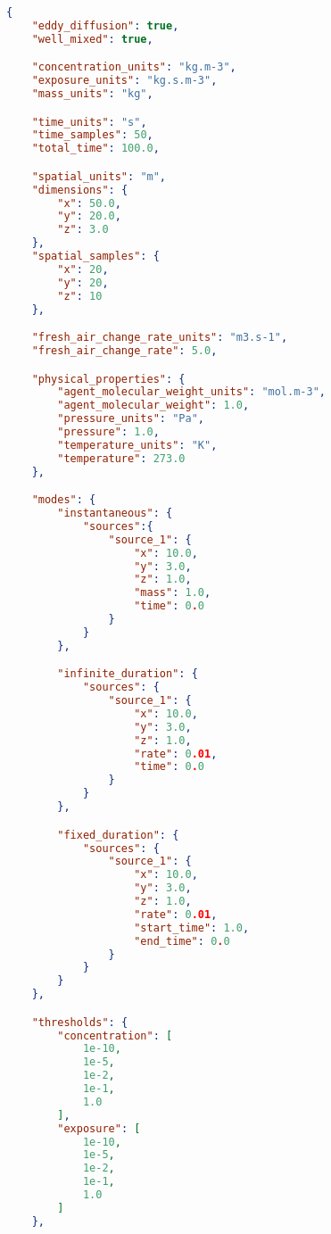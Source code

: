 \begin{lstlisting}[language=json,firstnumber=1]
{
    "eddy_diffusion": true,
    "well_mixed": true,

    "concentration_units": "kg.m-3",
    "exposure_units": "kg.s.m-3",
    "mass_units": "kg",

    "time_units": "s",
    "time_samples": 50,
    "total_time": 100.0,

    "spatial_units": "m",
    "dimensions": {
        "x": 50.0,
        "y": 20.0,
        "z": 3.0
    },
    "spatial_samples": {
        "x": 20,
        "y": 20,
        "z": 10 
    },

    "fresh_air_change_rate_units": "m3.s-1",
    "fresh_air_change_rate": 5.0,

    "physical_properties": {
        "agent_molecular_weight_units": "mol.m-3",
        "agent_molecular_weight": 1.0,
        "pressure_units": "Pa",
        "pressure": 1.0,
        "temperature_units": "K",
        "temperature": 273.0
    },

    "modes": {
        "instantaneous": {
            "sources":{
                "source_1": {
                    "x": 10.0,
                    "y": 3.0,
                    "z": 1.0,
                    "mass": 1.0,
                    "time": 0.0
                }
            }
        },

        "infinite_duration": {
            "sources": {
                "source_1": {
                    "x": 10.0,
                    "y": 3.0,
                    "z": 1.0,
                    "rate": 0.01,
                    "time": 0.0
                }
            }
        },

        "fixed_duration": {
            "sources": {
                "source_1": {
                    "x": 10.0,
                    "y": 3.0,
                    "z": 1.0,
                    "rate": 0.01,
                    "start_time": 1.0,
                    "end_time": 0.0
                }
            }
        }
    },

    "thresholds": {
        "concentration": [
            1e-10,
            1e-5,
            1e-2,
            1e-1,
            1.0
        ],
        "exposure": [
            1e-10,
            1e-5,
            1e-2,
            1e-1,
            1.0
        ]
    },


\end{lstlisting}
